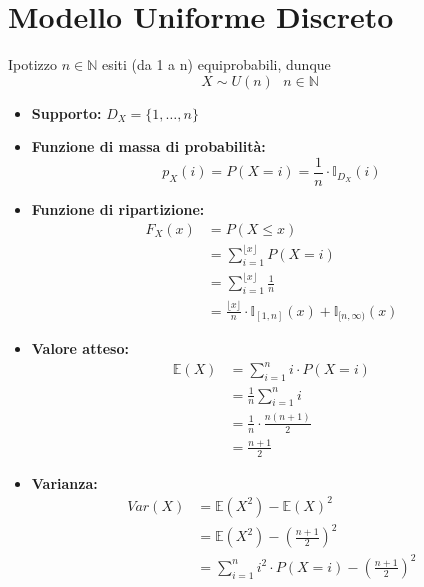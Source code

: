 \documentclass[11pt]{report}
\begin{document}
\section{Modello Uniforme Discreto}
Ipotizzo $n \in \mathbb{N}$ esiti (da 1 a n) equiprobabili, dunque
\begin{equation}
    X \sim U(n)\ \ \ n \in \mathbb{N}
\end{equation}
\begin{itemize}
    \item \textbf{Supporto:} $D_X=\{1,\dots,n\}$
    \item \textbf{Funzione di massa di probabilità:}
    \begin{equation}
        p_X(i) = P(X = i) = \frac{1}{n} \cdot \mathbb{I}_{D_X}(i)
    \end{equation}
    \item \textbf{Funzione di ripartizione:}
    \begin{equation}
        \begin{split}
            F_X(x) & = P(X \leq x)\\
            & = \sum_{i=1}^{\lfloor x\rfloor} P(X = i)\\
            & = \sum_{i=1}^{\lfloor x\rfloor} \frac{1}{n}\\
            & = \frac{\lfloor x\rfloor}{n} \cdot \mathbb{I}_{[1,n]}(x)+\mathbb{I}_{[n,\infty)}(x)
        \end{split}
    \end{equation}
    \item \textbf{Valore atteso:}
    \begin{equation}
    	\begin{split}
   			\mathbb{E}(X) & = \sum_{i=1}^n i \cdot P(X=i)\\
   			& = \frac{1}{n} \sum_{i=1}^n i\\
   			& = \frac{1}{n} \cdot \frac{n(n+1)}{2}\\
   			& = \frac{n+1}{2}
		\end{split}
    \end{equation}
    \item \textbf{Varianza:}
    \begin{equation}
    	\begin{split}
   			Var(X) & = \mathbb{E}(X^2) - \mathbb{E}(X)^2\\
            & = \mathbb{E}(X^2) - \left(\frac{n+1}{2}\right)^2\\
            & = \sum_{i=1}^n i^2 \cdot P(X=i) - \left(\frac{n+1}{2}\right)^2\\

\end{split}
\end{equation}
\end{itemize}
\end{document}
